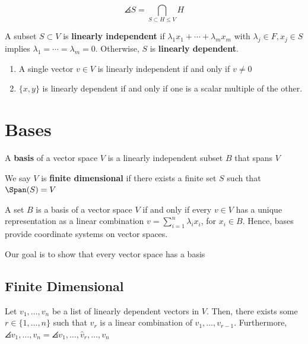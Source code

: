 \begin{rmk}
    $$\angles S = \bigcap_{S \subset H \leq V}H$$
\end{rmk}

\begin{defn}
    A subset $S \subset V $ is \textbf{linearly independent} if $\lambda_1x_1+\cdots +\lambda_m x_m$ with $\lambda_j \in F,x_j \in S$ implies $\lambda_1=\cdots =\lambda_m=0$. Otherwise, $S$ is \textbf{linearly dependent}.
\end{defn}

\begin{lem}
    \begin{enumerate}
        \item[(a)] A single vector $v \in V$ is linearly independent if and only if $v \neq 0$
        \item[(b)] $\{x,y\}$ is linearly dependent if and only if one is a scalar multiple of the other.
    \end{enumerate}
\end{lem}

\section{Bases}

\begin{defn}
    A \textbf{basis} of a vector space $V$ is a linearly independent subset $B$ that spans $V$
\end{defn}

\begin{defn}
    We say $V$ is \textbf{finite dimensional} if there exists a finite set $S$ such that $\Span (S) = V$
\end{defn}

\begin{rmk}
    A set $B$ is a basis of a vector space $V$ if and only if every $v \in V$ has a unique representation as a linear combination $v=\sum_{i=1}^n\lambda _ix_i$, for $x_i \in B$. Hence, bases provide coordinate systems on vector spaces.
\end{rmk}

Our goal is to show that every vector space has a basis

\subsection{Finite Dimensional}

\begin{lem}
    Let $v_1,\dots,v_n$ be a list of linearly dependent vectors in $V$. Then, there exists some $r \in \{1,\dots,n\}$ such that $v_r$ is a linear combination of $v_1,\dots,v_{r-1}$. Furthermore, $\angles{v_1,\dots,v_n}=\angles{v_1,\dots,\hat v_r,\dots,v_n}$
\end{lem}

